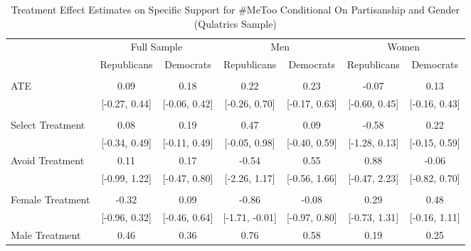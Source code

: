 \documentclass[
]{article}
\begin{document}
\begin{table}[H]

\caption{\label{tab:tabF4}Treatment Effect Estimates on Specific Support for \#MeToo Conditional On Partisanship and Gender (Qulatrics Sample)}
\centering
\begin{threeparttable}
\begin{tabular}[t]{lcccccc}
\toprule
\multicolumn{1}{c}{ } & \multicolumn{2}{c}{Full Sample} & \multicolumn{2}{c}{Men} & \multicolumn{2}{c}{Women} \\
\cmidrule(l{3pt}r{3pt}){2-3} \cmidrule(l{3pt}r{3pt}){4-5} \cmidrule(l{3pt}r{3pt}){6-7}
  & Republicans & Democrats & Republicans & Democrats & Republicans & Democrats\\
\midrule
\addlinespace[0.3em]
\multicolumn{7}{l}{\textbf{ATE}}\\
\hspace{1em}ATE & 0.09 & 0.18 & 0.22 & 0.23 & -0.07 & 0.13\\
\hspace{1em} & {}[-0.27, 0.44] & {}[-0.06, 0.42] & {}[-0.26, 0.70] & {}[-0.17, 0.63] & {}[-0.60, 0.45] & {}[-0.16, 0.43]\\
\addlinespace[0.3em]
\multicolumn{7}{l}{\textbf{ACTE}}\\
\hspace{1em}Select Treatment & 0.08 & 0.19 & 0.47 & 0.09 & -0.58 & 0.22\\
\hspace{1em} & {}[-0.34, 0.49] & {}[-0.11, 0.49] & {}[-0.05, 0.98] & {}[-0.40, 0.59] & {}[-1.28, 0.13] & {}[-0.15, 0.59]\\
\hspace{1em}Avoid Treatment & 0.11 & 0.17 & -0.54 & 0.55 & 0.88 & -0.06\\
\hspace{1em} & {}[-0.99, 1.22] & {}[-0.47, 0.80] & {}[-2.26, 1.17] & {}[-0.56, 1.66] & {}[-0.47, 2.23] & {}[-0.82, 0.70]\\
\addlinespace[0.3em]
\multicolumn{7}{l}{\textbf{CACTE}}\\
\hspace{1em}Female Treatment & -0.32 & 0.09 & -0.86 & -0.08 & 0.29 & 0.48\\
\hspace{1em} & {}[-0.96, 0.32] & {}[-0.46, 0.64] & {}[-1.71, -0.01] & {}[-0.97, 0.80] & {}[-0.73, 1.31] & {}[-0.16, 1.11]\\
\hspace{1em}Male Treatment & 0.46 & 0.36 & 0.76 & 0.58 & 0.19 & 0.25\\

\end{tabular}
\end{threeparttable}
\end{table}
\end{document}
